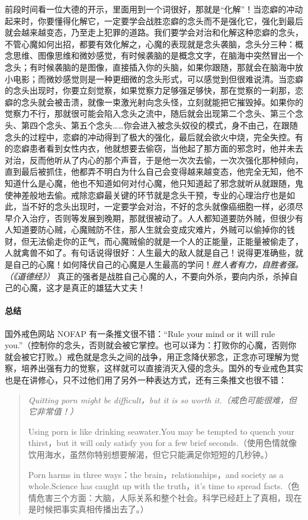 前段时间看一位大德的开示，里面用到一个词很好，那就是“化解”！当恋癖的冲动起来时，你要懂得化解它，一定要学会战胜恋癖的念头而不是强化它，强化到最后就会越来越变态，乃至走上犯罪的道路。我们要学会对治和化解这种恋癖的念头，不管心魔如何出招，都要有效化解之，心魔的表现就是念头袭脑，念头分三种：概念思维、图像思维和微妙感觉，有时候袭脑的是概念文字，在脑海中突然冒出一个念头；有时候袭脑的是图像，直接插入你的头脑，如果你跟随，那就会在脑海中放小电影；而微妙感觉则是一种更细微的念头形式，可以感觉到但很难说清。当恋癖的念头出现时，你要立刻觉察，如果觉察力足够强足够快，那在觉察的一刹那，恋癖的念头就会被击溃，就像一束激光射向念头怪，立刻就能把它摧毁掉。如果你的觉察力不行，那就很可能会陷入念头之流中，随后就会出现第二个念头、第三个念头、第四个念头、第五个念头……你会进入被念头奴役的模式，身不由己，在跟随念头的过程中，恋癖的冲动得到了极大的强化，最后就会欲火中烧，完全失控。有的恋癖患者看到女性内衣，他就想要去偷窃，当他起了那方面的邪念时，他并未去对治，反而他听从了内心的那个声音，于是他一次次去偷，一次次强化那种倾向，直到最后被抓住，他都弄不明白为什么自己会变得越来越变态，他完全无知，他不知道什么是心魔，他也不知道如何对付心魔，他只知道起了邪念就听从就跟随，鬼使神差般地去偷。戒除恋癖最关键的环节就是念头干预，专业的心理治疗也是如此，当不好的念头出现时，一定要学会对治，不好的念头就像癌细胞一样，必须尽早介入治疗，否则等发展到晚期，那就很被动了。人人都知道要防外贼，但很少有人知道要防心贼，心魔贼防不住，那人生就会变成灾难片，外贼可以偷掉你的钱财，但无法偷走你的正气，而心魔贼偷的就是一个人的正能量，正能量被偷走了，人就禽兽不如了。有句话说得很好：人生最大的敌人就是自己！说得更准确些，就是自己的心魔！如何降伏自己的心魔是人生最高的学问！\textit{胜人者有力，自胜者强。（《道德经》）} 真正的强者是战胜自己心魔的人，不要向外杀，要向内杀，杀掉自己的心魔，这才是真正的雄猛大丈夫！

\paragraph*{总结}

国外戒色网站 NOFAP 有一条推文很不错：“Rule your mind or it will rule you.”（控制你的念头，否则就会被它掌控。也可以译为：打败你的心魔，否则你就会被它打败。）戒色就是念头之间的战争，用正念降伏邪念，正念亦可理解为觉察，培养出强有力的觉察，这样就可以直接消灭入侵的念头。国外的专业戒色其实也是在讲修心，只不过他们用了另外一种表达方式，还有三条推文也很不错：

\begin{quotation}\it
    Quitting porn might be difficult，but it is so worth it.（戒色可能很难，但它非常值！）

    Using porn is like drinking seawater.You may be tempted to quench your thirst，but it will only satisfy you for a few brief seconds.（使用色情就像饮用海水，虽然你特别想要解渴，但它只能满足你短短的几秒钟。）

    Porn harms in three ways：the brain，relationships，and society as a whole.Science has caught up with the truth，it's time to spread facts.（色情危害三个方面：大脑，人际关系和整个社会。科学已经赶上了真相，现在是时候把事实真相传播出去了。）
\end{quotation}

